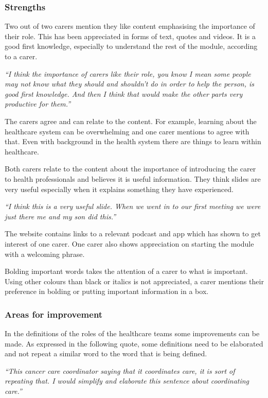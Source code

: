 \documentclass{sigchi}
\begin{document}
\subsubsection{Strengths}
Two out of two carers mention they like content emphasising the importance of their role. This has been appreciated in forms of text, quotes and videos. It is a good first knowledge, especially to understand the rest of the module, according to a carer.

\textit{“I think the importance of carers like their role, you know I mean some people may not know what they should and shouldn't do in order to help the person, is good first knowledge. And then I think that would make the other parts very productive for them.”}

The carers agree and can relate to the content. For example, learning about the healthcare system can be overwhelming and one carer mentions to agree with that. Even with background in the health system there are things to learn within healthcare.

Both carers relate to the content about the importance of introducing the carer to health professionals and believes it is useful information. They think slides are very useful especially when it explains something they have experienced.

\textit{“I think this is a very useful slide. When we went in to our first meeting we were just there me and my son did this.”}

The website contains links to a relevant podcast and app which has shown to get interest of one carer. One carer also shows appreciation on starting the module with a welcoming phrase.

Bolding important words takes the attention of a carer to what is important. Using other colours than black or italics is not appreciated, a carer mentions their preference in bolding or putting important information in a box.

\subsubsection{Areas for improvement}
In the definitions of the roles of the healthcare teams some improvements can be made. As expressed in the following quote, some definitions need to be elaborated and not repeat a similar word to the word that is being defined.

\textit{“This cancer care coordinator saying that it coordinates care, it is sort of repeating that. I would simplify and elaborate this sentence about coordinating care.”}
\end{document}
